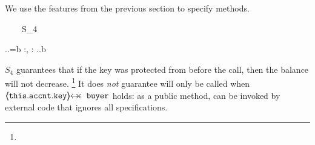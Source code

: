  
 \begin{example}
 We   use the features from the previous section to specify methods. 

{\sprepostShort
		{\strut \ \ \ \ S_4} 
		{    {} \wedge {}.\prg{\myAccount}.\prg{\balance}=b
		 }
		{} {} {:, : }
		{ 
		  .\prg{\myAccount}.\prg{\balance}\geq b
		 }
}

\noindent
$S_4$  guarantees that if the %
key was protected from  before the call, then the balance will not decrease. %
\footnote{}
 It does \emph{not} guarantee  will only be called when $\protectedFrom{\prg{this}.\prg{\myAccount}.\prg{key}} {\prg{buyer}}$ holds: 
as a  public method,    can be invoked by external code that ignores all specifications.
\end{example}


